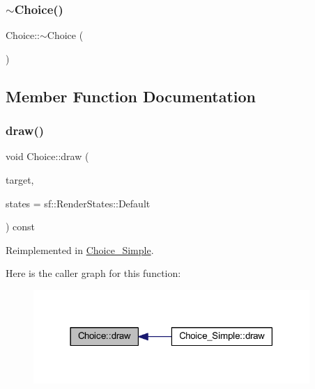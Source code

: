 \subsubsection{\texorpdfstring{$\sim$\+Choice()}{~Choice()}}
{\footnotesize\ttfamily Choice\+::$\sim$\+Choice (\begin{DoxyParamCaption}{ }\end{DoxyParamCaption})\hspace{0.3cm}{\ttfamily [virtual]}}



\subsection{Member Function Documentation}
\mbox{\label{class_choice_ad6a03ce8c892eacabef3691feba37b0f}} 
\subsubsection{\texorpdfstring{draw()}{draw()}}
{\footnotesize\ttfamily void Choice\+::draw (\begin{DoxyParamCaption}\item[{sf\+::\+Render\+Target \&}]{target,  }\item[{sf\+::\+Render\+States}]{states = {\ttfamily sf\+:\+:RenderStates\+:\+:Default} }\end{DoxyParamCaption}) const\hspace{0.3cm}{\ttfamily [virtual]}}



Reimplemented in \hyperlink{class_choice___simple_ae8f4cedc34a10d3c35efce8cec1bec54}{Choice\+\_\+\+Simple}.

Here is the caller graph for this function\+:
\nopagebreak
\begin{figure}[H]
\begin{center}
\leavevmode
\includegraphics[width=297pt]{class_choice_ad6a03ce8c892eacabef3691feba37b0f_icgraph}
\end{center}
\end{figure}
\mbox{\label{class_choice_a8b901a892c521edcdb02c49c5bd057a8}} 
